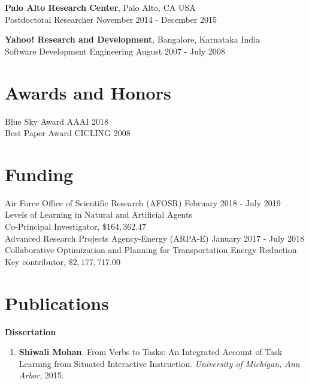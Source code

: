 \documentclass[margin,line,11pt]{res}
\begin{document}
\begin{resume}
          {\bf Palo Alto Research Center}, Palo Alto, CA USA \\
          {Postdoctoral Researcher} \hfill November 2014 - December 2015 
                  
          {\bf Yahoo! Research and Development}, Bangalore, Karnataka India \\
          {Software Development Engineering} \hfill August 2007 - July 2008


          \section{\sc Awards and Honors}
          Blue Sky Award \hfill AAAI 2018\\
          Best Paper Award \hfill CICLING 2008\\
          
          

          \section{\sc Funding}
          Air Force Office of Scientific Research (AFOSR) \hfill February 2018 - July 2019\\
          Levels of Learning in Natural and Artificial Agents\\
          Co-Principal Investigator, $\$164,362.47$\\
       
          Advanced Research Projects Agency-Energy (ARPA-E) \hfill January 2017 - July 2018 \\
          Collaborative Optimization and Planning for Transportation Energy Reduction\\
          Key contributor, $\$2,177,717.00$\\
          


\section{\sc Publications}
\textbf{Dissertation}
\begin{enumerate}[label=\lbrack D\arabic*\rbrack, leftmargin=*]
\item \textbf{Shiwali Mohan}.  From Verbs to Tasks: An Integrated Account of Task Learning from Situated Interactive Instruction. \emph{University of Michigan, Ann Arbor}, 2015.
\end{enumerate}


\end{resume}
\end{document}

